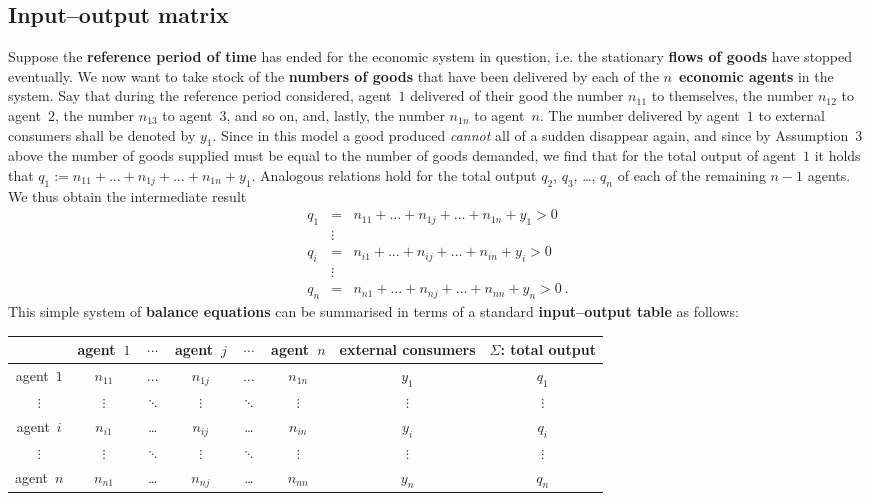 \subsection{Input--output matrix}
Suppose the {\bf reference period of time} has ended for the 
economic system in question, i.e. the stationary {\bf flows of 
goods} have stopped eventually. We now want to take stock of the 
{\bf numbers of goods} that have been delivered by each of the 
$n$~{\bf economic agents} in the system. Say that during the 
reference period considered, agent~$1$ delivered of their good the 
number $n_{11}$ to themselves, the number $n_{12}$ to agent~$2$, 
the number $n_{13}$ to agent~$3$, and so on, and, lastly, the 
number $n_{1n}$ to agent~$n$. The number delivered by agent~$1$ to 
external consumers shall be denoted by $y_{1}$. Since in this 
model a good produced \emph{cannot} all of a sudden disappear 
again, and since by Assumption~3 above the number of goods 
supplied must be equal to the number of goods demanded, we find 
that for the total output of agent~$1$ it holds that 
$q_{1}:=n_{11} + \ldots + n_{1j} + \ldots + n_{1n} + y_{1}$. 
Analogous relations hold for the total output $q_{2}$, $q_{3}$, 
\ldots, $q_{n}$ of each of the remaining $n-1$ agents. We thus 
obtain the intermediate result
%
\begin{eqnarray}
q_{1} & = & n_{11} + \ldots + n_{1j} + \ldots + n_{1n} + y_{1} > 0
\\
 & \vdots & \nonumber \\
q_{i} & = & n_{i1} + \ldots + n_{ij} + \ldots + n_{in} + y_{i} > 0
\\
 & \vdots & \nonumber \\
q_{n} & = & n_{n1} + \ldots + n_{nj} + \ldots + n_{nn} + y_{n} > 0
\ .
\end{eqnarray}
%
This simple system of {\bf balance equations} can be summarised in terms of a standard {\bf input--output table} as follows:
%
\begin{center}
    \begin{tabular}[h]{c|ccccc|c|c}
    \hline\hline
    [Values in $\text{units}$] & agent~$1$ & $\cdots$ & agent~$j$ & $\cdots$ & agent~$n$ & external consumers & $\Sigma$: total output  \\
    \hline
    agent~$1$ & $n_{11}$ & $\ldots$ & $n_{1j}$ & $\ldots$ & $n_{1n}$ & $y_{1}$ & $q_{1}$ \\
    $\vdots$ & $\vdots$ & $\ddots$ & $\vdots$ & $\ddots$ & $\vdots$ & $\vdots$ & $\vdots$ \\
    agent~$i$ & $n_{i1}$ & \ldots & $n_{ij}$ & \ldots & $n_{in}$ & $y_{i}$ & $q_{i}$ \\
    $\vdots$ & $\vdots$ & $\ddots$ & $\vdots$ & $\ddots$ & $\vdots$ & $\vdots$ & $\vdots$ \\
    agent~$n$ & $n_{n1}$ & \ldots & $n_{nj}$ & \ldots & $n_{nn}$ & $y_{n}$ & $q_{n}$ \\
    \hline\hline
    \end{tabular}
\end{center}
